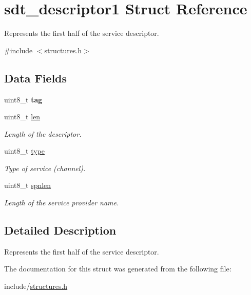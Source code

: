 \hypertarget{structsdt__descriptor1}{}\section{sdt\+\_\+descriptor1 Struct Reference}
\label{structsdt__descriptor1}


Represents the first half of the service descriptor.  




{\ttfamily \#include $<$structures.\+h$>$}

\subsection*{Data Fields}
\begin{DoxyCompactItemize}
\item 
uint8\+\_\+t {\bfseries tag}\hypertarget{structsdt__descriptor1_aa016fa383d1adbba32c10213d468da56}{}\label{structsdt__descriptor1_aa016fa383d1adbba32c10213d468da56}

\item 
uint8\+\_\+t \hyperlink{structsdt__descriptor1_a8ae0d9f33bf71c2246a31282ea9a3dad}{len}\hypertarget{structsdt__descriptor1_a8ae0d9f33bf71c2246a31282ea9a3dad}{}\label{structsdt__descriptor1_a8ae0d9f33bf71c2246a31282ea9a3dad}

\begin{DoxyCompactList}\small\item\em Length of the descriptor. \end{DoxyCompactList}\item 
uint8\+\_\+t \hyperlink{structsdt__descriptor1_a3b97c6652a50982dd0224a8abde26c0f}{type}\hypertarget{structsdt__descriptor1_a3b97c6652a50982dd0224a8abde26c0f}{}\label{structsdt__descriptor1_a3b97c6652a50982dd0224a8abde26c0f}

\begin{DoxyCompactList}\small\item\em Type of service (channel). \end{DoxyCompactList}\item 
uint8\+\_\+t \hyperlink{structsdt__descriptor1_aad8404a3a38becdc9bf617787824c328}{spnlen}\hypertarget{structsdt__descriptor1_aad8404a3a38becdc9bf617787824c328}{}\label{structsdt__descriptor1_aad8404a3a38becdc9bf617787824c328}

\begin{DoxyCompactList}\small\item\em Length of the service provider name. \end{DoxyCompactList}\end{DoxyCompactItemize}


\subsection{Detailed Description}
Represents the first half of the service descriptor. 

The documentation for this struct was generated from the following file\+:\begin{DoxyCompactItemize}
\item 
include/\hyperlink{structures_8h}{structures.\+h}\end{DoxyCompactItemize}

